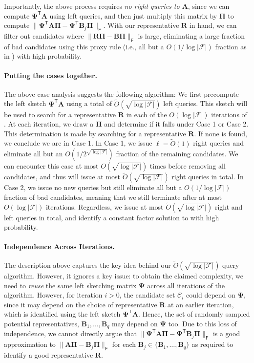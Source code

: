 \documentclass{article}[11pt]
\theoremstyle{definition}
\newcommand{\bv}[1]{\boldsymbol{\mathbf{#1}}}
\newcommand{\T}{\mathsf{T}}
\newcommand{\Fro}{\mathsf{F}}
\newcommand{\F}{\mathcal{F}}
\begin{document}
    Importantly, the above process requires \emph{no right queries to $\bv A$}, since we can compute $\bv{\Psi}^\T \bv A$ using left queries, and then just multiply this matrix by $\bv \Pi$ to compute  $\|\bv{\Psi}^\T\bv{A}\bv{\Pi} - \bv{\Psi}^\T\bv{B}_j\bv{\Pi}\|_\Fro$.
    With our representative $\bv{R}$ in hand, we can filter out candidates where $\|\bv{R\Pi}-\bv{B\Pi}\|_\Fro$ is large, eliminating a large fraction of bad candidates using this proxy rule (i.e., all but a $O(1/\log|\F|)$ fraction as in ) with high probability.

    \paragraph{Putting the cases  together.}
    The above case analysis suggests the following algorithm:
    We first precompute the left sketch $\bv{\Psi}^\T \bv{A}$ using a total of $\tilde O(\sqrt{\log |\mathcal F|})$ left queries. This sketch will be used to search for a representative $\bv R$ in each of the $O(\log|\F|)$ iterations of .
    At each iteration, we draw a $\bv{\Pi}$ and determine if it falls under Case 1 or Case 2. This determination is made by searching for a representative $\bv{R}$. If none is found, we conclude we are in Case 1.
    In Case 1, we issue $\ell = \tilde O(1)$ right queries and eliminate all but an $O(1/2^{\sqrt{\log |\mathcal F|}})$ fraction of the remaining candidates. We can encounter this case at most $O(\sqrt{\log |\F|})$ times before removing all candidates, and thus will issue at most $\tilde O(\sqrt{\log |\F|})$ right queries in total.
    In Case 2, we issue no new queries but still eliminate all but a $O(1/\log|\F|)$ fraction of bad candidates, meaning that we still terminate after at most $O(\log |\F|)$ iterations. 
    Regardless, we issue at most $\tilde O(\sqrt{\log |\mathcal F|})$ right and left queries in total, and identify a constant factor solution to  with high probability.
    

\paragraph{Independence Across Iterations.} The description above captures the key idea behind our $\tilde O(\sqrt{\log |\F|})$ query algorithm. However, it ignores a key issue:
to obtain the claimed complexity, we need to \emph{reuse} the same  left sketching matrix $\bv{\Psi}$ across all iterations of the algorithm. 
However, for iteration $i > 0$, the candidate set $\mathcal{C}_i$ could depend on $\bv{\Psi}$, since it may depend on the choice of representative $\bv{R}$ at an earlier iteration, which is identified using the left sketch $\bv{\Psi}^\T \bv A$. Hence, the set of randomly sampled potential representatives, $\bv{B}_1, \ldots, \bv{B}_q$ may depend on $\bv{\Psi}$ too.
Due to this loss of independence, we cannot directly argue that $\|\bv{\Psi}^\T\bv{A}\bv{\Pi} - \bv{\Psi}^\T\bv{B}_j\bv{\Pi}\|_\Fro$ is a good approximation to $\|\bv{A}\bv{\Pi} - \bv{B}_j\bv{\Pi}\|_\Fro$ for each $\bv B_j\in \{\bv B_1, \ldots, \bv B_q\}$ as required to identify a good representative $\bv R$.
\end{document}
